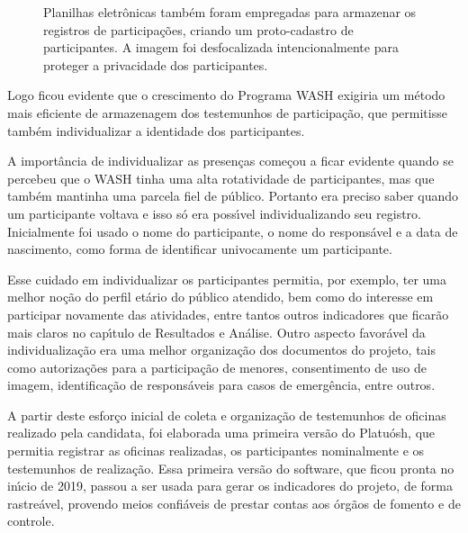 \documentclass[
12pt,		%
openright,	%
twoside,  %
a4paper,			%
chapter=TITLE,		%
english,			%
french,				%
spanish,			%
brazil				%
]{USPSC-classe/USPSC}
\begin{document}
\begin{figure}[max size={\textwidth}{\textheight}]
\begin{minipage}[b]{0.4\linewidth}
                \caption{Planilhas eletr\^onicas tamb\'em foram empregadas para armazenar os registros de participa\c{c}\~oes, criando um proto-cadastro de participantes. A imagem foi desfocalizada intencionalmente para proteger a privacidade dos participantes.}
                \label{b43907f0fa6b6fb935e7384ab03b508859ff0609}
\end{minipage}%
\hspace{0.5cm}
\end{figure}



Logo ficou evidente que o crescimento do Programa WASH exigiria um m\'etodo mais eficiente de armazenagem dos testemunhos de participa\c{c}\~ao, que permitisse tamb\'em individualizar a identidade dos participantes.




A import\^ancia de individualizar as presen\c{c}as come\c{c}ou a ficar evidente quando se percebeu que o WASH tinha uma alta rotatividade de participantes, mas que tamb\'em mantinha uma parcela fiel de \textquotedbl p\'ublico\textquotedbl . Portanto era preciso saber quando um participante voltava e isso s\'o era poss\'{\i}vel individualizando seu registro. Inicialmente foi usado o nome do participante, o nome do respons\'avel e a data de nascimento, como forma de identificar univocamente um participante.




Esse cuidado em individualizar os participantes permitia, por exemplo, ter uma melhor no\c{c}\~ao do perfil et\'ario do p\'ublico atendido, bem como do interesse em participar novamente das atividades, entre tantos outros indicadores que ficar\~ao mais claros no cap\'{\i}tulo de Resultados e An\'alise. Outro aspecto favor\'avel da individualiza\c{c}\~ao era uma melhor organiza\c{c}\~ao dos documentos do projeto, tais como autoriza\c{c}\~oes para a participa\c{c}\~ao de menores, consentimento de uso de imagem, identifica\c{c}\~ao de respons\'aveis para casos de emerg\^encia, entre outros.




A partir deste esfor\c{c}o inicial de coleta e organiza\c{c}\~ao de testemunhos de oficinas realizado pela candidata, foi elaborada uma primeira vers\~ao do Platu\'osh, que permitia registrar as oficinas realizadas, os participantes nominalmente e os testemunhos de realiza\c{c}\~ao. Essa primeira vers\~ao do software, que ficou pronta no in\'{\i}cio de 2019, passou a ser usada para gerar os indicadores do projeto, de forma rastre\'avel, provendo meios confi\'aveis de prestar contas aos \'org\~aos de fomento e de controle.
\end{document}
